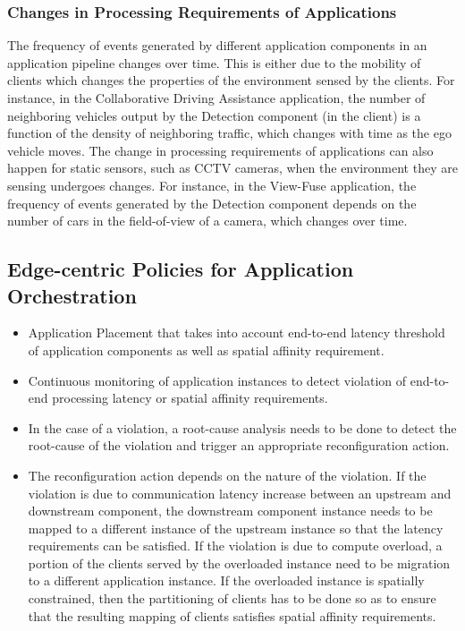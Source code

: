 \subsubsection{Changes in Processing Requirements of Applications}
The frequency of events generated by different application components in an application pipeline changes over time. This is either due to the mobility of clients which changes the properties of the environment sensed by the clients. For instance, in the Collaborative Driving Assistance application, the number of neighboring vehicles output by the Detection component (in the client) is a function of the density of neighboring traffic, which changes with time as the ego vehicle moves. The change in processing requirements of applications can also happen for static sensors, such as CCTV cameras, when the environment they are sensing undergoes changes. For instance, in the View-Fuse application, the frequency of events generated by the Detection component depends on the number of cars in the field-of-view of a camera, which changes over time.

\subsection{Edge-centric Policies for Application Orchestration}

\begin{itemize}
\item Application Placement that takes into account end-to-end latency threshold of application components as well as spatial affinity requirement.
\item Continuous monitoring of application instances to detect violation of end-to-end processing latency or spatial affinity requirements.
\item In the case of a violation, a root-cause analysis needs to be done to detect the root-cause of the violation and trigger an appropriate reconfiguration action.
\item The reconfiguration action depends on the nature of the violation. If the violation is due to communication latency increase between an upstream and downstream component, the downstream component instance needs to be mapped to a different instance of the upstream instance so that the latency requirements can be satisfied. If the violation is due to compute overload, a portion of the clients served by the overloaded instance need to be migration to a different application instance. If the overloaded instance is spatially constrained, then the partitioning of clients has to be done so as to ensure that the resulting mapping of clients satisfies spatial affinity requirements.
\end{itemize}

